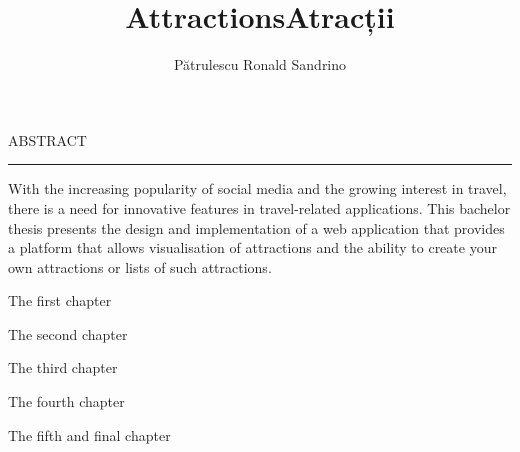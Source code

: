 \documentclass[12pt]{report}
\begin{document}
\title{Attractions}					   
\author{Pătrulescu Ronald Sandrino}											
				
\maketitle

\title{Atracții}

\maketitle

{} 

\cleardoublepage
ABSTRACT
\vspace{0.5cm}	
\hrule
\vspace{0.5cm}	

\par With the increasing popularity of social media and the growing interest in travel, there is a need for innovative features in travel-related applications. This bachelor thesis presents the design and implementation of a web application that provides a platform that allows visualisation of attractions and the ability to create your own attractions or lists of such attractions.

\par The first chapter

\par The second chapter

\par The third chapter

\par The fourth chapter

\par The fifth and final chapter




\tableofcontents


\newpage
{}










\end{document}
